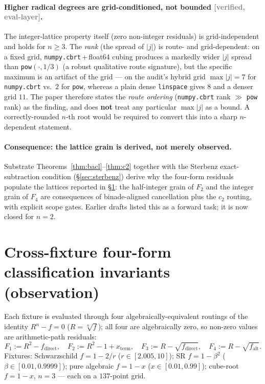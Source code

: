 \documentclass[11pt,a4paper]{article}
\newcommand{\status}[1]{\textcolor{gray}{\small\textsf{[#1]}}}
\begin{document}
\paragraph{Higher radical degrees are grid-conditioned, not bounded \status{verified, eval-layer}.} The integer-lattice property itself (zero non-integer residuals) is grid-independent and holds for $n\ge3$. The \emph{rank} (the spread of $|j|$) is route- and grid-dependent: on a fixed grid, \texttt{numpy.cbrt}\,+\,float64 cubing produces a markedly wider $|j|$ spread than \texttt{pow}$(\cdot,1/3)$ (a robust qualitative route signature), but the specific maximum is an artifact of the grid --- on the audit's hybrid grid $\max|j|=7$ for \texttt{numpy.cbrt} vs.\ $2$ for \texttt{pow}, whereas a plain dense \texttt{linspace} gives $8$ and a denser grid $11$. The paper therefore states the \emph{route ordering} (\texttt{numpy.cbrt} rank $\gg$ \texttt{pow} rank) as the finding, and does \textbf{not} treat any particular $\max|j|$ as a bound. A correctly-rounded $n$-th root would be required to convert this into a sharp $n$-dependent statement.

\paragraph{Consequence: the lattice grain is derived, not merely observed.} Substrate Theorems~\ref{thm:bacl}--\ref{thm:c2} together with the Sterbenz exact-subtraction condition (\S\ref{sec:sterbenz}) derive why the four-form residuals populate the lattices reported in \S\ref{sec:crossfixture}: the half-integer grain of $F_2$ and the integer grain of $F_4$ are consequences of binade-aligned cancellation plus the $c_2$ routing, with explicit scope gates. Earlier drafts listed this as a forward task; it is now closed for $n{=}2$.

\section{Cross-fixture four-form classification invariants (observation)}\label{sec:crossfixture}

Each fixture is evaluated through four algebraically-equivalent routings of the identity $R^n-f=0$ ($R=\sqrt[n]{f}$); all four are algebraically zero, so non-zero values are arithmetic-path residuals:
\[
F_1:=R^2-f_{\mathrm{direct}},\quad
F_2:=R^2-1+x_{\mathrm{term}},\quad
F_3:=R-\sqrt{f_{\mathrm{direct}}},\quad
F_4:=R-\sqrt{f_{\mathrm{alt}}}.
\]
Fixtures: Schwarzschild $f=1-2/r$ ($r\in[2.005,10]$); SR $f=1-\beta^2$ ($\beta\in[0.01,0.9999]$); pure algebraic $f=1-x$ ($x\in[0.01,0.99]$); cube-root $f=1-x$, $n{=}3$ --- each on a $137$-point grid.
\end{document}

